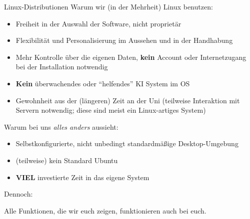 \begin{frame}{Linux-Distributionen}
    Warum wir (in der Mehrheit) Linux benutzen:
    \begin{itemize}
        \item Freiheit in der Auswahl der Software, nicht proprietär
        \item Flexibilität und Personalisierung im Aussehen und in der Handhabung
        \item Mehr Kontrolle über die eigenen Daten, \textbf{kein} Account oder
          Internetzugang bei der Installation notwendig
        \item \textbf{Kein} überwachendes oder \enquote{helfendes} KI System im OS
        \item Gewohnheit aus der (längeren) Zeit an der Uni (teilweise Interaktion mit Servern
            notwendig; diese sind meist ein Linux-artiges System)
    \end{itemize}
    Warum bei uns \textit{alles anders} aussieht:
    \begin{itemize}
        \item Selbstkonfigurierte, nicht unbedingt standardmäßige Desktop-Umgebung
        \item (teilweise) kein Standard Ubuntu
        \item \textbf{VIEL} investierte Zeit in das eigene System
    \end{itemize}

    Dennoch:

    Alle Funktionen, die wir euch zeigen, funktionieren auch bei euch.

\end{frame}
